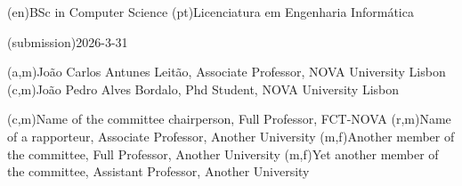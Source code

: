 \ntauthordegree(en){BSc in Computer Science}
\ntauthordegree(pt){Licenciatura em Engenharia Informática}

\ntdate(submission){2026-3-31}

(a,m){João Carlos Antunes Leitão, Associate Professor, NOVA University Lisbon}
(c,m){João Pedro Alves Bordalo, Phd Student, NOVA University Lisbon}

(c,m){Name of the committee chairperson, Full Professor, FCT-NOVA}
(r,m){Name of a rapporteur, Associate Professor, Another University}
(m,f){Another member of the committee, Full Professor, Another University}
(m,f){Yet another member of  the committee, Assistant Professor, Another University}
